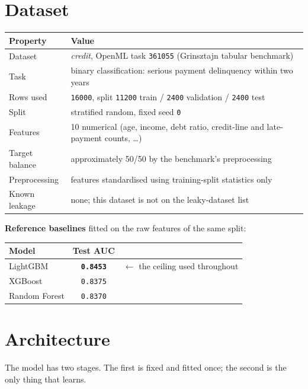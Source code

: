 \documentclass[11pt,a4paper]{article}
\newcommand{\num}[1]{\texttt{#1}}
\begin{document}
\section{Dataset}

\begin{table}[h]\centering\small
\begin{tabular}{ll}
\toprule
\textbf{Property} & \textbf{Value}\\
\midrule
Dataset & \emph{credit}, OpenML task \num{361055} (Grinsztajn tabular benchmark)\\
Task & binary classification: serious payment delinquency within two years\\
Rows used & \num{16000}, split \num{11200} train / \num{2400} validation / \num{2400} test\\
Split & stratified random, fixed seed \num{0}\\
Features & 10 numerical (age, income, debt ratio, credit-line and late-payment counts, \dots)\\
Target balance & approximately 50/50 by the benchmark's preprocessing\\
Preprocessing & features standardised using training-split statistics only\\
Known leakage & none; this dataset is not on the leaky-dataset list\\
\bottomrule
\end{tabular}
\end{table}

\noindent\textbf{Reference baselines} fitted on the raw features of the same
split:

\begin{table}[h]\centering\small
\begin{tabular}{lcc}
\toprule
\textbf{Model} & \textbf{Test AUC} & \\
\midrule
LightGBM & \textbf{\num{0.8453}} & $\leftarrow$ the ceiling used throughout\\
XGBoost & \num{0.8375} & \\
Random Forest & \num{0.8370} & \\
\bottomrule
\end{tabular}
\end{table}

\section{Architecture}

The model has two stages. The first is fixed and fitted once; the second is the
only thing that learns.
\end{document}
